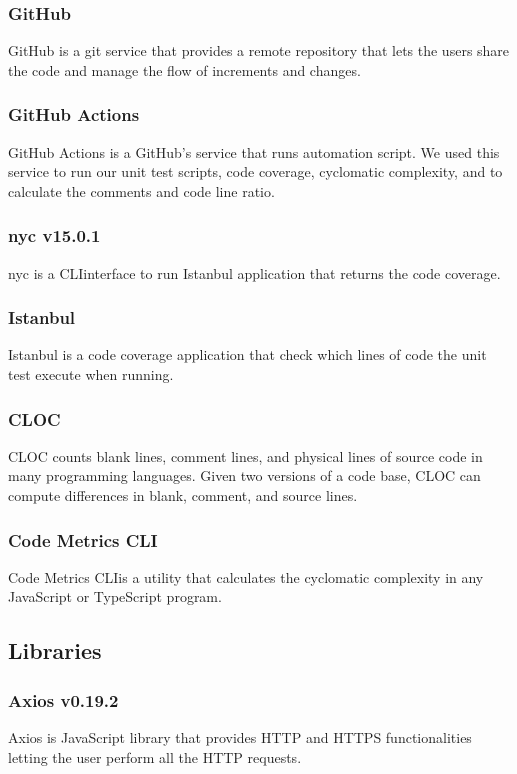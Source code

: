 \subsubsection*{GitHub}
GitHub is a git service that provides a remote repository that lets the users share the code and manage the flow of increments and changes.

\subsubsection*{GitHub Actions}
GitHub Actions is a GitHub's service that runs automation script.
We used this service to run our unit test scripts, code coverage, cyclomatic complexity, and to calculate the comments and code line ratio.

\subsubsection*{nyc v15.0.1}
nyc is a CLI\glo interface to run Istanbul application that returns the code coverage.

\subsubsection*{Istanbul}
Istanbul is a code coverage application that check which lines of code the unit test execute when running.

\subsubsection*{CLOC}
CLOC counts blank lines, comment lines, and physical lines of source code in many programming languages. Given two versions of a code base, CLOC can compute differences in blank, comment, and source lines.

\subsubsection*{Code Metrics CLI}
Code Metrics CLI\glo is a utility that calculates the cyclomatic complexity in any JavaScript or TypeScript program.


\subsection{Libraries}

\subsubsection*{Axios v0.19.2}
Axios is JavaScript library that provides HTTP and HTTPS functionalities letting the user perform all the HTTP requests.

